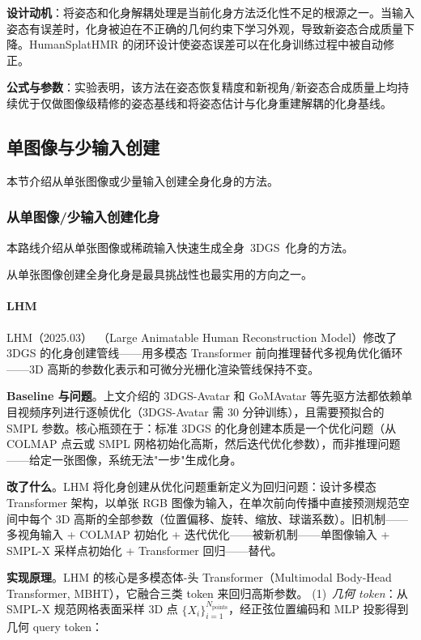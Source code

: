\textbf{设计动机}：将姿态和化身解耦处理是当前化身方法泛化性不足的根源之一。当输入姿态有误差时，化身被迫在不正确的几何约束下学习外观，导致新姿态合成质量下降。HumanSplatHMR 的闭环设计使姿态误差可以在化身训练过程中被自动修正。

\textbf{公式与参数}：实验表明，该方法在姿态恢复精度和新视角/新姿态合成质量上均持续优于仅做图像级精修的姿态基线和将姿态估计与化身重建解耦的化身基线。

\subsection{单图像与少输入创建}
\label{ss:16_2_单图像与}

本节介绍从单张图像或少量输入创建全身化身的方法。

\subsubsection{从单图像/少输入创建化身}

本路线介绍从单张图像或稀疏输入快速生成全身~3DGS~化身的方法。

从单张图像创建全身化身是最具挑战性也最实用的方向之一。

\paragraph{LHM}

LHM（2025.03）~\cite{2503_10625}（Large Animatable Human Reconstruction Model）修改了 3DGS 的化身创建管线——用多模态 Transformer 前向推理替代多视角优化循环——3D 高斯的参数化表示和可微分光栅化渲染管线保持不变。

\textbf{Baseline 与问题}。上文介绍的 3DGS-Avatar 和 GoMAvatar 等先驱方法都依赖单目视频序列进行逐帧优化（3DGS-Avatar 需 30 分钟训练），且需要预拟合的 SMPL 参数。核心瓶颈在于：标准 3DGS 的化身创建本质是一个优化问题（从 COLMAP 点云或 SMPL 网格初始化高斯，然后迭代优化参数），而非推理问题——给定一张图像，系统无法"一步"生成化身。

\textbf{改了什么}。LHM 将化身创建从优化问题重新定义为回归问题：设计多模态 Transformer 架构，以单张 RGB 图像为输入，在单次前向传播中直接预测规范空间中每个 3D 高斯的全部参数（位置偏移、旋转、缩放、球谐系数）。旧机制——多视角输入 + COLMAP 初始化 + 迭代优化——被新机制——单图像输入 + SMPL-X 采样点初始化 + Transformer 回归——替代。

\textbf{实现原理}。LHM 的核心是多模态体-头 Transformer（Multimodal Body-Head Transformer, MBHT），它融合三类 token 来回归高斯参数。
(1)~\textit{几何 token}：从 SMPL-X 规范网格表面采样 3D 点 $\{X_i\}_{i=1}^{N_{\text{points}}}$，经正弦位置编码和 MLP 投影得到几何 query token：

